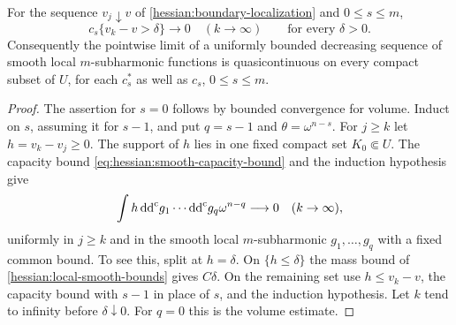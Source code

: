 \begin{proposition}\label{hessian:smooth-capacity-convergence}
For the sequence $v_j\downarrow v$ of
\cref{hessian:boundary-localization} and $0\leq s\leq m$,
\[
 c_s\{v_k-v>\delta\}\longrightarrow0
                 \quad(k\to\infty)\qquad\text{for every }\delta>0.
\]
Consequently the pointwise limit of a uniformly bounded decreasing
sequence of smooth local $m$-subharmonic functions is quasicontinuous
on every compact subset of $U$, for each $c_s^*$ as well as $c_s$,
$0\leq s\leq m$.
\end{proposition}
\begin{proof}
The assertion for $s=0$ follows by bounded convergence for volume.
Induct on $s$, assuming it for $s-1$, and put $q=s-1$ and
$\theta=\omega^{n-s}$. For $j\geq k$ let $h=v_k-v_j\geq0$.
The support of $h$ lies in one fixed compact set $K_0\Subset U$.
The capacity bound \eqref{eq:hessian:smooth-capacity-bound} and the
induction hypothesis give
\begin{equation}\label{eq:hessian:lower-weight}
 \int h\,\mathrm{dd}^{\mathrm{c}} g_1\cdots\mathrm{dd}^{\mathrm{c}} g_q\omega^{n-q}
                          \longrightarrow0\quad(k\to\infty),
\end{equation}
uniformly in $j\geq k$ and in the smooth local $m$-subharmonic
$g_1,\ldots,g_q$ with a fixed common bound.
To see this, split at $h=\delta$. On $\{h\leq\delta\}$ the mass
bound of \cref{hessian:local-smooth-bounds} gives $C\delta$. On the
remaining set use $h\leq v_k-v$, the capacity bound with $s-1$ in
place of $s$, and the induction hypothesis. Let $k$ tend to
infinity before $\delta\downarrow0$. For $q=0$ this is the volume
estimate.


\end{proof}

